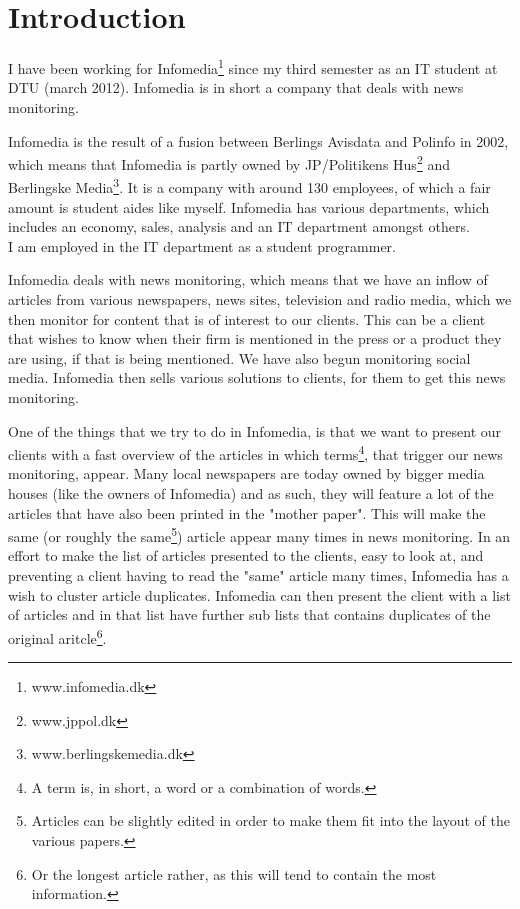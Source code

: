 \chapter{Introduction}
I have been working for Infomedia\footnote{www.infomedia.dk} since my third semester as an IT student at DTU (march 2012). Infomedia is in short a company that deals with news monitoring.

Infomedia is the result of a fusion between Berlings Avisdata and Polinfo in 2002, which means that Infomedia is partly owned by JP/Politikens Hus\footnote{www.jppol.dk} and Berlingske Media\footnote{www.berlingskemedia.dk}. It is a company with around 130 employees, of which a fair amount is student aides like myself. Infomedia has various departments, which includes an economy, sales, analysis and an IT department amongst others.\\
I am employed in the IT department as a student programmer.

Infomedia deals with news monitoring, which means that we have an inflow of articles from various newspapers, news sites, television and radio media, which we then monitor for content that is of interest to our clients. This can be a client that wishes to know when their firm is mentioned in the press or a product they are using, if that is being mentioned. We have also begun monitoring social media. Infomedia then sells various solutions to clients, for them to get this news monitoring.

One of the things that we try to do in Infomedia, is that we want to present our clients with a fast overview of the articles in which terms\footnote{A term is, in short, a word or a combination of words.}, that trigger our news monitoring, appear. Many local newspapers are today owned by bigger media houses (like the owners of Infomedia) and as such, they will feature a lot of the articles that have also been printed in the "mother paper". This will make the same (or roughly the same\footnote{Articles can be slightly edited in order to make them fit into the layout of the various papers.}) article appear many times in news monitoring. In an effort to make the list of articles presented to the clients, easy to look at, and preventing a client having to read the "same" article many times, Infomedia has a wish to cluster article duplicates. Infomedia can then present the client with a list of articles and in that list have further sub lists that contains duplicates of the original aritcle\footnote{Or the longest article rather, as this will tend to contain the most information.}.

